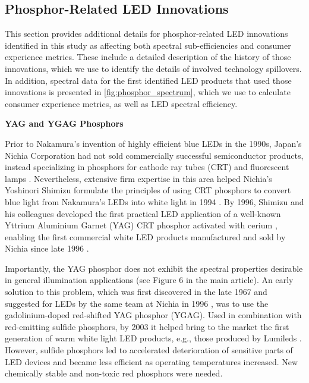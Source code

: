 \documentclass[parskip=full]{article}
\begin{document}
\clearpage
\subsection{Phosphor-Related LED Innovations}
\label{sec:innovation_phosphor}

This section provides additional details for phosphor-related LED innovations identified in this study as affecting both spectral sub-efficiencies and consumer experience metrics. These include a detailed description of the history of those innovations, which we use to identify the details of involved technology spillovers. In addition, spectral data for the first identified LED products that used those innovations is presented in \cref{fig:phosphor_spectrum}, which we use to calculate consumer experience metrics, as well as LED spectral efficiency.

\textbf{YAG and YGAG Phosphors}

Prior to Nakamura’s invention of highly efficient blue LEDs in the 1990s, Japan’s Nichia Corporation had not sold commercially successful semiconductor products, instead specializing in phosphors for cathode ray tubes (CRT) and fluorescent lamps \cite{nakamura2013blue}  . Nevertheless, extensive firm expertise in this area helped Nichia’s Yoshinori Shimizu formulate the principles of using CRT phosphors to convert blue light from Nakamura’s LEDs into white light in 1994 \cite{shimizu1994sheet}\cite{cho2017white}. By 1996, Shimizu and his colleagues developed \cite{bando1996}\cite{shimizu1999light} the first practical LED application of a well-known Yttrium Aluminium Garnet (YAG) CRT phosphor activated with cerium \cite{blasse1967new}, enabling the first commercial white LED products manufactured and sold by Nichia since late 1996 \cite{bando1998development}\cite{cho2017white}. 

Importantly, the YAG phosphor does not exhibit the spectral properties desirable in general illumination applications (see Figure 6 in the main article). An early solution to this problem, which was first discovered in the late 1967 \cite{holloway1969optical} and suggested for LEDs by the same team at Nichia in 1996 \cite{bando1998development}\cite{shimizu1999light}, was to use the gadolinium-doped red-shifted YAG phosphor (YGAG). Used in combination with red-emitting sulfide phosphors, by 2003 it helped bring to the market the first generation of warm white light LED products, e.g., those produced by Lumileds \cite{Mueller2002}. However, sulfide phosphors led to accelerated deterioration of sensitive parts of LED devices and became less efficient as operating temperatures increased. New chemically stable and non-toxic red phosphors were needed. 
\end{document}

